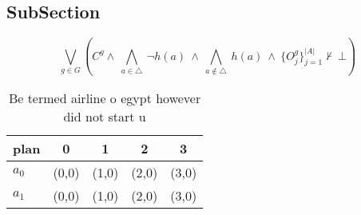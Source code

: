 \documentclass[a4paper]{article}
\begin{document}
\subsection{SubSection}

\[\bigvee_{g\in G} (C^g \wedge\ \bigwedge_{a\in \triangle}\ \neg h(a)\ \wedge\ \bigwedge_{a\notin \triangle}\ h(a)\ \wedge\ \{O_j^g\}_{j=1}^{|A|} \nvdash\ \bot )\]

\begin{table}
\begin{adjustbox}{width=0.7\columnwidth}
\begin{tabular}{|l|l|l|l|l|}
\hline
\textbf{plan} & \multicolumn{1}{c|}{\textbf{0}} & \multicolumn{1}{c|}{\textbf{1}} & \multicolumn{1}{c|}{\textbf{2}} & \multicolumn{1}{c|}{\textbf{3}} \\ \hline
\textbf{$a_0$}  & (0,0) & (1,0) & (2,0) & (3,0) \\ \hline
\textbf{$a_1$}  & (0,0) & (1,0) & (2,0) & (3,0) \\ \hline
\end{tabular}
\end{adjustbox}
\caption{Be termed airline o egypt however did not start u
}
\end{table}
\end{document}
